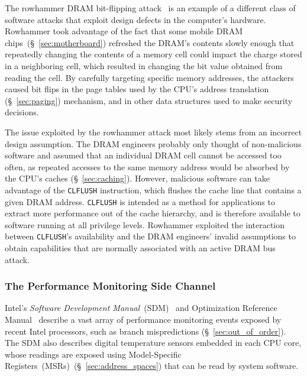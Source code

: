 The rowhammer DRAM bit-flipping attack~\cite{kim2014rowhammer,
google2015rowhammer, gruss2015rowhammer} is an example of a different class of
software attacks that exploit design defects in the computer's hardware.
Rowhammer took advantage of the fact that some mobile DRAM
chips~(\S~\ref{sec:motherboard}) refreshed the DRAM's contents slowly enough
that repeatedly changing the contents of a memory cell could impact the charge
stored in a neighboring cell, which resulted in changing the bit value obtained
from reading the cell. By carefully targeting specific memory addresses, the
attackers caused bit flips in the page tables used by the CPU's address
translation (\S~\ref{sec:paging}) mechanism, and in other data structures used
to make security decisions.

The issue exploited by the rowhammer attack most likely stems from an incorrect
design assumption. The DRAM engineers probably only thought of non-malicious
software and assumed that an individual DRAM cell cannot be accessed too
often, as repeated accesses to the same memory address would be absorbed by the
CPU's caches (\S~\ref{sec:caching}). However, malicious software can take
advantage of the \texttt{CLFLUSH} instruction, which flushes the cache line
that contains a given DRAM address. \texttt{CLFLUSH} is intended as a method
for applications to extract more performance out of the cache hierarchy, and
is therefore available to software running at all privilege levels. Rowhammer
exploited the interaction between \texttt{CLFLUSH}'s availability and the DRAM
engineers' invalid assumptions to obtain capabilities that are normally
associated with an active DRAM bus attack.


\subsubsection{The Performance Monitoring Side Channel}
\label{sec:perfmon_attacks}


Intel's \textit{Software Development Manual}~(SDM)~\cite{intel2015sdm} and
Optimization Reference Manual~\cite{intel2014optimization} describe a vast
array of performance monitoring events exposed by recent Intel processors,
such as branch mispredictions (\S~\ref{sec:out_of_order}). The SDM also
describes digital temperature sensors embedded in each CPU core, whose readings
are exposed using Model-Specific Registers~(MSRs)~(\S~\ref{sec:address_spaces})
that can be read by system software.

